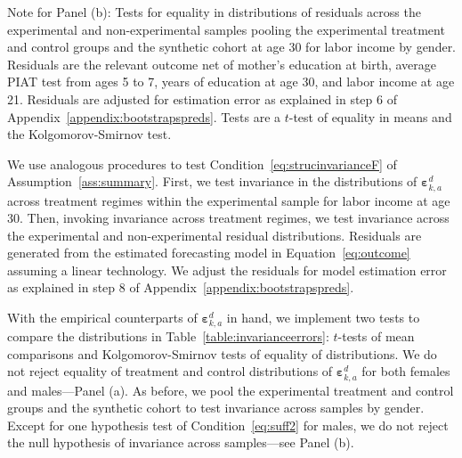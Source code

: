 \begin{table}[!htpb]
\begin{threeparttable}
\begin{tablenotes}
Note for Panel (b): Tests for equality in distributions of residuals across the experimental and non-experimental samples pooling the experimental treatment and control groups and the synthetic cohort at age 30 for labor income by gender.  Residuals are the relevant outcome net of mother's education at birth, average PIAT test from ages 5 to 7, years of education at age 30, and labor income at age 21. Residuals are adjusted for estimation error as explained in step 6 of Appendix~\ref{appendix:bootstrapspreds}. Tests are a $t$-test of equality in means and the Kolgomorov-Smirnov test.\\
\end{tablenotes}
\end{threeparttable}
\end{table}

We use analogous procedures to test Condition~\eqref{eq:strucinvarianceF} of Assumption~\ref{ass:summary}. First, we test invariance in the distributions of $\bm{\varepsilon}_{k,a}^d$ across treatment regimes within the experimental sample for labor income at age 30. Then, invoking invariance across treatment regimes, we test invariance across the experimental and non-experimental residual distributions. Residuals are generated from the estimated forecasting model in Equation~\eqref{eq:outcome} assuming a linear technology. We adjust the residuals for model estimation error as explained in step 8 of Appendix~\ref{appendix:bootstrapspreds}.

With the empirical counterparts of $\bm{\varepsilon}_{k,a}^d$ in hand, we implement two tests to compare the distributions in Table~\ref{table:invarianceerrors}: $t$-tests of mean comparisons and Kolgomorov-Smirnov tests of equality of distributions. We do not reject equality of treatment and control distributions of $\bm{\varepsilon}_{k,a}^d$ for both females and males---Panel (a). As before, we pool the experimental treatment and control groups and the synthetic cohort to test invariance across samples by gender. Except for one hypothesis test of Condition~\eqref{eq:suff2} for males, we do not reject the null hypothesis of invariance across samples---see Panel (b).

